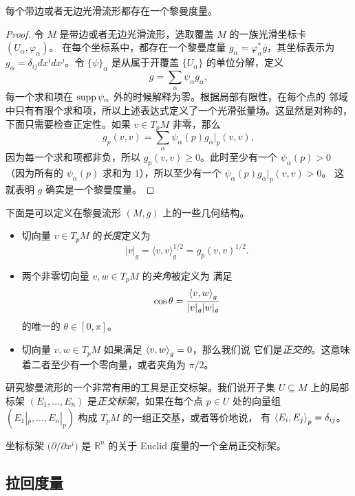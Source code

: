 \begin{proposition}[黎曼度量的存在性]
  每个带边或者无边光滑流形都存在一个黎曼度量。
\end{proposition}
\begin{proof}
  令 $M$ 是带边或者无边光滑流形，选取覆盖 $M$ 的一族光滑坐标卡 $(U_\alpha,\varphi_\alpha)$。
  在每个坐标系中，都存在一个黎曼度量 $g_\alpha=\varphi_\alpha^*\bar g$，其坐标表示为
  $g_\alpha=\delta_{ij}dx^idx^j$。令 $\{\psi\}_\alpha$ 是从属于开覆盖 $\{U_\alpha\}$
  的单位分解，定义
  \[
    g=\sum_\alpha \psi_\alpha g_\alpha,
  \]
  每一个求和项在 $\operatorname{supp}\psi_\alpha$ 外的时候解释为零。根据局部有限性，在每个点的
  邻域中只有有限个求和项，所以上述表达式定义了一个光滑张量场。这显然是对称的，
  下面只需要检查正定性。如果 $v\in T_pM$ 非零，那么 
  \[
    g_p(v,v)=\sum_\alpha\psi_\alpha(p)g_\alpha|_p(v,v),
  \]
  因为每一个求和项都非负，所以 $g_p(v,v)\geq 0$。此时至少有一个 $\psi_\alpha(p)>0$
  （因为所有的 $\psi_\alpha(p)$ 求和为 $1$），所以至少有一个 $\psi_\alpha(p)g_\alpha|_p(v,v)>0$。
  这就表明 $g$ 确实是一个黎曼度量。
\end{proof}

下面是可以定义在黎曼流形 $(M,g)$ 上的一些几何结构。
\begin{itemize}[noitemsep]
  \item 切向量 $v\in T_pM$ 的\emph{长度}定义为
  \[
    |v|_g=\langle v,v\rangle_g^{1/2}=g_p(v,v)^{1/2}.  
  \]
  \item 两个非零切向量 $v,w\in T_pM$ 的\emph{夹角}被定义为
  满足
  \[
    \cos\theta=\frac{\left\langle v,w\right\rangle_g}{|v|_g|w|_g}
  \]
  的唯一的 $\theta\in [0,\pi]$。
  \item 切向量 $v,w\in T_pM$ 如果满足 $\left\langle v,w\right\rangle_g=0$，那么我们说
  它们是\emph{正交的}。这意味着二者至少有一个零向量，或者夹角为 $\pi/2$。
\end{itemize}

研究黎曼流形的一个非常有用的工具是正交标架。我们说开子集 $U\subseteq M$
上的局部标架 $(E_1,\dots,E_n)$ 是\emph{正交标架}，如果在每个点 $p\in U$
处的向量组 $(E_1|_p,\dots,E_n|_p)$ 构成 $T_pM$ 的一组正交基，或者等价地说，
有 $\left\langle E_i,E_j\right\rangle_p=\delta_{ij}$。

\begin{example}
  坐标标架 $\bigl(\partial/\partial x^i\bigr)$ 是 $\mathbb{R}^n$
  的关于 Euclid 度量的一个全局正交标架。
\end{example}


\subsection{拉回度量}

